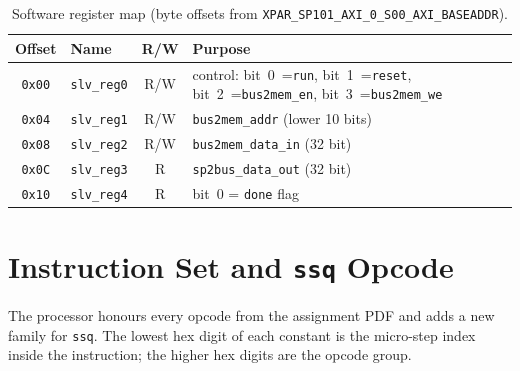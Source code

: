 \documentclass[11pt,letterpaper]{article}
\begin{document}
\begin{table}[H]
    \centering
    \caption{Software register map (byte offsets from
             \texttt{XPAR\_SP101\_AXI\_0\_S00\_AXI\_BASEADDR}).}
    \label{tab:regs}
    \small
    \begin{tabular}{clcp{8.0cm}}
        \toprule
        \textbf{Offset} & \textbf{Name} & \textbf{R/W} & \textbf{Purpose} \\
        \midrule
        \texttt{0x00} & \texttt{slv\_reg0} & R/W &
            control: bit~0~=\texttt{run}, bit~1~=\texttt{reset},
            bit~2~=\texttt{bus2mem\_en}, bit~3~=\texttt{bus2mem\_we} \\
        \texttt{0x04} & \texttt{slv\_reg1} & R/W &
            \texttt{bus2mem\_addr} (lower 10 bits) \\
        \texttt{0x08} & \texttt{slv\_reg2} & R/W &
            \texttt{bus2mem\_data\_in} (32 bit) \\
        \texttt{0x0C} & \texttt{slv\_reg3} & R   &
            \texttt{sp2bus\_data\_out} (32 bit) \\
        \texttt{0x10} & \texttt{slv\_reg4} & R   &
            bit~0 = \texttt{done} flag \\
        \bottomrule
    \end{tabular}
\end{table}

\section{Instruction Set and \texttt{ssq} Opcode}

The processor honours every opcode from the assignment PDF and adds a
new family for \texttt{ssq}.  The lowest hex digit of each constant is
the micro-step index inside the instruction; the higher hex digits are
the opcode group.
\end{document}
